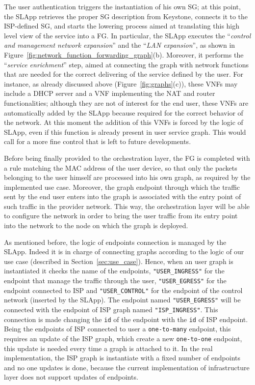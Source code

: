 The user authentication triggers the instantiation of his own SG; at this point, the SLApp retrieves the proper SG description from Keystone, connects it to the ISP-defined SG, and starts the lowering process aimed at translating this high level view of the service into a FG.
In particular, the SLApp executes the ``\textit{control and management network expansion}'' and the ``\textit{LAN expansion}'', as shown in Figure~\ref{fig:network_function_forwarding_graph}(b).
Moreover, it performs the ``\textit{service enrichment}'' step, aimed at connecting the graph with network functions that are needed for the correct delivering of the service defined by the user.
For instance, as already discussed above (Figure~\ref{fig:graphs}(c)), these VNFs may include a DHCP server and a VNF implementing the NAT and router functionalities; although they are not of interest for the end user, these VNFs are automatically added by the SLApp because required for the correct behavior of the network. At this moment the addition of this VNFs is forced by the logic of SLApp, even if this function is already present in user service graph. This would call for a more fine control that is left to future developments.

Before being finally provided to the orchestration layer, the FG is completed with a rule matching the MAC address of the user device, so that only the packets belonging to the user himself are processed into his own graph, as required by the implemented use case. %
Moreover, the graph endpoint through which the traffic sent by the end user enters into the graph is associated with the entry point of such traffic in the provider network.
This way, the orchestration layer will be able to configure the network in order to bring the user traffic from its entry point into the network to the node on which the graph is deployed.

As mentioned before, the logic of endpoints connection is managed by the SLApp. Indeed it is in charge of connecting graphs  according to the logic of our use case (described in Section~\ref{sec:use_case}). Hence, when an user graph is instantiated it checks the name of the endpoints, \texttt{"USER\_INGRESS"} for the endpoint that manage the traffic through the user, \texttt{"USER\_EGRESS"} for the endpoint connected to ISP and \texttt{"USER\_CONTROL"} for the endpoint of the control network (inserted by the SLApp). The endpoint named \texttt{"USER\_EGRESS"} will be connected with the endpoint of ISP graph named \texttt{"ISP\_INGRESS"}. This connection is made changing the \texttt{id} of the endpoint with the \texttt{id} of ISP endpoint. Being the endpoints of ISP connected to user a \texttt{one-to-many} endpoint, this requires an update of the ISP graph, which create a new \texttt{one-to-one} endpoint, this update is needed every time a graph is attached to it. In the real implementation, the ISP graph is instantiate with a fixed number of endpoints and no one updates is done, because the current implementation of infrastructure layer does not support updates of endpoints. 

